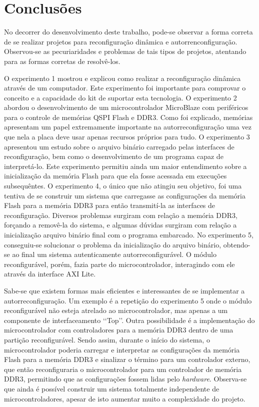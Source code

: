 ﻿%
                      

\chapter{Conclus\~{o}es}\label{CapConclusoes}
No decorrer do desenvolvimento deste trabalho, pode-se observar a forma correta de se realizar projetos para reconfiguração dinâmica e autorrenconfiguração.
Observou-se as pecuriaridades e problemas de tais tipos de projetos, atentando para as formas corretas de resolvê-los.

O experimento 1 mostrou e explicou como realizar a reconfiguração dinâmica através de um computador.
Este experimento foi importante para comprovar o conceito e a capacidade do kit de suportar esta tecnologia.
O experimento 2 abordou o desenvolvimento de um microcontrolador MicroBlaze com periféricos para o controle de memórias QSPI Flash e DDR3.
Como foi explicado, memórias apresentam um papel extremamente importante na autorreconfiguração uma vez que nela a placa deve usar apenas recursos próprios para tudo.
O experimento 3 apresentou um estudo sobre o arquivo binário carregado pelas interfaces de reconfiguração, bem como o desenvolvimento de um programa capaz de interpretá-lo.
Este experimento permitiu ainda um maior entendimento sobre a inicialização da memória Flash para que ela fosse acessada em execuções subsequêntes.
O experimento 4, o único que não atingiu seu objetivo, foi uma tentiva de se construir um sistema que carregasse as configurações da memória Flash para a memória DDR3 para então transmití-la as interfaces de reconfiguração.
Diversos problemas surgiram com relação a memória DDR3, forçando a removê-la do sistema, e algumas dúvidas surgiram com relação a inicialização arquivo binário final com o programa embarcado.
No experimento 5, conseguiu-se solucionar o problema da inicialização do arquivo binário, obtendo-se ao final um sistema autenticamente autorreconfigurável.
O módulo reconfigurável, porém, fazia parte do microcontrolador, interagindo com ele através da interface AXI Lite.



Sabe-se que existem formas mais eficientes e interessantes de se implementar a autorreconfiguração.
Um exemplo é a repetição do experimento 5 onde o módulo reconfigurável não esteja atrelado ao microcontrolador, mas apenas a um componente de interfaceamento \lq\lq{}Top\rq\rq{}.
Outra possibilidade é a implementação do microcontrolador com controladores para a memória DDR3 dentro de uma partição reconfigurável.
Sendo assim, durante o início do sistema, o microcontrolador poderia carregar e interpretar as configurações da memória Flash para a memória DDR3 e sinalizar o término para um controlador externo, que então reconfiguraria o microcontrolador para um controlador de memória DDR3, permitindo que as configurações fossem lidas pelo \textit{hardware}.
Observa-se que ainda é possível construir um sistema totalmente independente de microcontroladores, apesar de isto aumentar muito a complexidade do projeto.